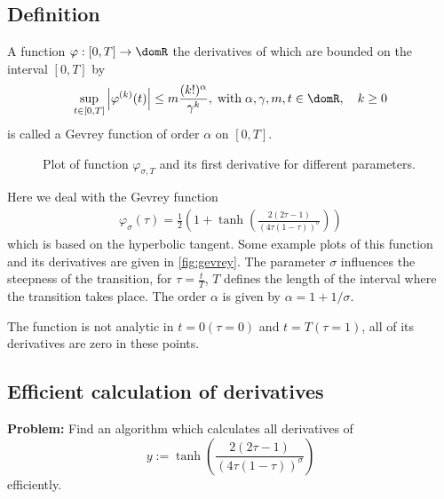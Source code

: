 \documentclass[a4paper,12pt,headinclude=true,headsepline,parskip=half,DIV=12]{scrartcl}
\begin{document}
\begin{appendices}
  \subsection{Definition}
  A function $\varphi:[0, T] \rightarrow \domR$ the derivatives of which are bounded on the interval $[0,T]$  by
  \begin{equation}\label{eq:gevrey:limit}
    \sup_{t \in [0,T]} \left| \varphi^{(k)}(t) \right| \leq m
    \frac{(k!)^{\alpha}}{\gamma^k}, \; \mbox{with} \;
    \alpha,\gamma,m,t   \in \domR, \quad k \geq 0
  \end{equation}
  is called a Gevrey function of order $\alpha$ on $[0, T]$.
  \begin{figure}[ht]
    \begin{center}
      \caption{Plot of function $\varphi_{\sigma,T}$  and its first derivative for different parameters.}
      \label{fig:gevrey}
    \end{center}
  \end{figure}
  Here we deal with the Gevrey function
  \begin{align}
    \varphi_\sigma\left(\tau\right) = \frac{1}{2}\left(1 + \tanh \left( \frac{2(2\tau-1)}{(4\tau(1-\tau))^\sigma}\right)\right)
  \end{align}
  which is based on the hyperbolic tangent. Some example plots of this function and its derivatives are given in
  \autoref{fig:gevrey}. The parameter $\sigma$ influences the steepness of the transition, for $\tau=\frac{t}{T}$, $T$ defines the length
  of the interval where the transition takes place. The order  $\alpha$ is given by $\alpha=1+1/\sigma$.

  The function is not analytic in  $t=0 (\tau = 0)$ and $t=T (\tau = 1)$, all of its derivatives are zero in these points.
  
  
  
  \subsection{Efficient calculation of derivatives}
  \textbf{Problem:} Find an algorithm which calculates all derivatives of
  \begin{equation}\label{eq:defy}
    y:=\tanh\left(\frac{2(2\tau-1)}{(4\tau(1-\tau))^{\sigma}}\right)
  \end{equation}
  efficiently.


\end{appendices}
\end{document}

